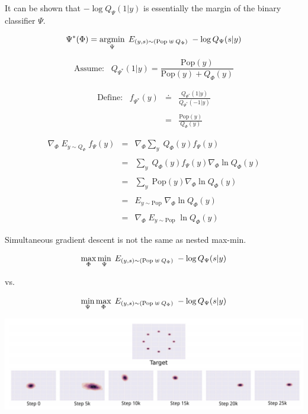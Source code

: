 {\vfill
It can be shown that $- \log Q_\Psi(1|y)$ is essentially the margin of the binary classifier $\Psi$.


$$\Psi^*(\Phi) = \operatorname*{argmin}_\Psi \;E_{(y,s) \sim (\mathrm{Pop}\; \uplus \;Q_\Phi)}\;- \log Q_\Psi(s|y)$$

\vfill
$$\mbox{Assume:}\;\;\; Q_{\Psi^*}(1|y) = \frac{\mathrm{Pop}(y)}{\mathrm{Pop}(y) + Q_\Phi(y)}$$

\vfill
\begin{eqnarray*}
  \mbox{Define:}\;\;\; f_{\Psi^*}(y) & \doteq & \frac{Q_{\Psi^*}(1|y)}{Q_{\Psi^*}(-1|y)} \\
\\
& = & \frac{\mathrm{Pop}(y)}{Q_\Phi(y)}
\end{eqnarray*}


\begin{eqnarray*}
 \nabla_\Phi \; E_{y \sim Q_\Phi}\;  f_\Psi(y)  & = & \nabla _\Phi \sum_y\; Q_\Phi(y) f_\Psi(y) \\
  \\
  & = & \sum_y \; Q_\Phi(y) f_\Psi(y) \nabla_\Phi \ln Q_\Phi(y) \\
  \\
  & = & \sum_y \;\mathrm{Pop}(y) \nabla_\Phi \ln Q_\Phi(y) \\
  \\
  & = & E_{y \sim \mathrm{Pop}} \; \nabla_\Phi \ln Q_\Phi(y) \\
  \\
  & = & \nabla_\Phi \; E_{y \sim \mathrm{Pop}} \;\ln Q_\Phi(y)
\end{eqnarray*}


Simultaneous gradient descent is not the same as nested max-min.

\vfill
$$\max_\Phi \min_\Psi \;E_{(y,s) \sim (\mathrm{Pop}\; \uplus \;Q_\Phi)}\;- \log Q_\Psi(s|y)$$

\vfill
vs.

\vfill
$$\min_\Psi \max_\Phi \;E_{(y,s) \sim (\mathrm{Pop}\; \uplus \;Q_\Phi)}\;- \log Q_\Psi(s|y)$$


\centerline{\includegraphics[width=9in]{../images/Unstable1}}

}
